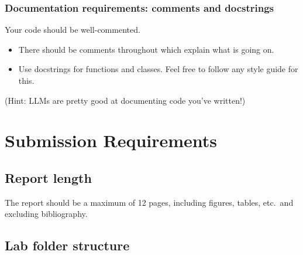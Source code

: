 \documentclass[letterpaper,12pt]{article}
\begin{document}
\subsubsection{Documentation requirements: comments and docstrings}
Your code should be well-commented.
\begin{itemize}
  \item There should be comments throughout which explain what is going on.
  \item Use docstrings for functions and classes. Feel free to follow any style guide for this.
\end{itemize}
(Hint: LLMs are pretty good at documenting code you've written!)

\section{Submission Requirements}

\subsection{Report length}
The report should be a maximum of 12 pages, including figures, tables, etc.~and excluding bibliography.

\subsection{Lab folder structure}
\end{document}
